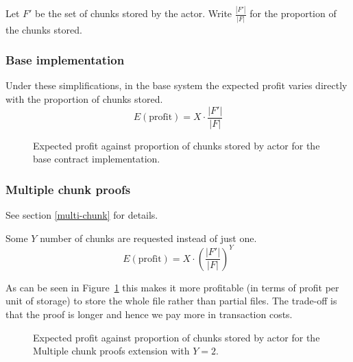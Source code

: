 \documentclass[10pt,twoside,a4paper]{article}
\begin{document}
Let $F'$ be the set of chunks stored by the actor. Write $\frac{|F'|}{|F|}$ for the proportion of the chunks stored.

\subsubsection{Base implementation}

Under these simplifications, in the base system
the expected profit varies directly with the proportion of chunks stored.
\[E(\text{profit}) = X \cdot \frac{|F'|}{|F|}\]

\begin{figure}[H]

\caption[Expected attacker profit: base implementation]{Expected profit against proportion of chunks stored by actor for the base contract implementation.}
\end{figure}


\subsubsection{Multiple chunk proofs}

See section \ref{multi-chunk} for details.

Some $Y$ number of chunks are requested instead of just one.
\[E(\text{profit}) = X \cdot \left(\frac{|F'|}{|F|}\right)^Y\]

As can be seen in Figure~\ref{eval-graph-multi} this makes it more profitable (in terms of profit per unit of storage)
to store the whole file rather than partial files. The trade-off is that the proof is longer and hence we pay more in transaction costs.

\begin{figure}[H]
\label{eval-graph-multi}
\caption[Expected attacker profit: multiple chunk proofs]{Expected profit against proportion of chunks stored by actor for the Multiple chunk proofs extension with $Y = 2$.}
\end{figure}
\end{document}
